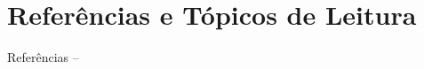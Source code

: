 \section{Referências e Tópicos de Leitura}

    \begin{frame}[allowframebreaks]{Referências -- }
        
        
    \end{frame}




